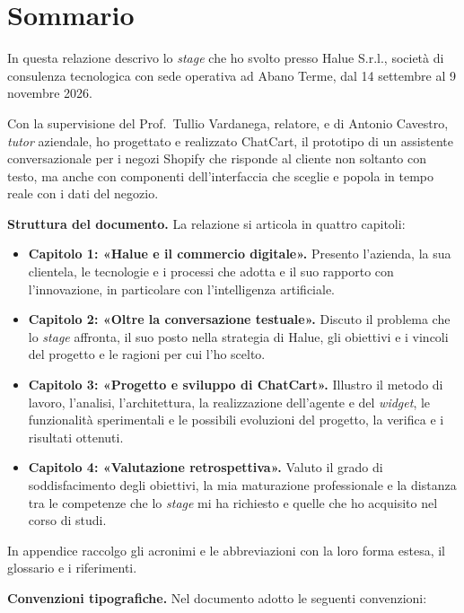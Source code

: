
\chapter*{Sommario}

In questa relazione descrivo lo \emph{stage} che ho svolto presso Halue S.r.l., società di
consulenza tecnologica con sede operativa ad Abano Terme, dal 14 settembre al 9 novembre 2026.

Con la supervisione del Prof. Tullio Vardanega, relatore, e di Antonio Cavestro, \emph{tutor}
aziendale, ho progettato e realizzato ChatCart, il prototipo di un assistente conversazionale per i
negozi Shopify che risponde al cliente non soltanto con testo, ma anche con componenti
dell’interfaccia che sceglie e popola in tempo reale con i dati del negozio.

\textbf{Struttura del documento.} La relazione si articola in quattro capitoli:

\begin{itemize}
        \item \textbf{Capitolo 1: «Halue e il commercio digitale».} Presento l’azienda, la sua
	clientela, le tecnologie e i processi che adotta e il suo rapporto con l’innovazione, in
	particolare con l’intelligenza artificiale.
        \item \textbf{Capitolo 2: «Oltre la conversazione testuale».} Discuto il problema che lo
	\emph{stage} affronta, il suo posto nella strategia di Halue, gli obiettivi e i vincoli del
	progetto e le ragioni per cui l’ho scelto.
        \item \textbf{Capitolo 3: «Progetto e sviluppo di ChatCart».} Illustro il metodo di lavoro,
	l’analisi, l’architettura, la realizzazione dell’agente e del \emph{widget}, le funzionalità
	sperimentali e le possibili evoluzioni del progetto, la verifica e i risultati ottenuti.
        \item \textbf{Capitolo 4: «Valutazione retrospettiva».} Valuto il grado di soddisfacimento
	degli obiettivi, la mia maturazione professionale e la distanza tra le competenze che lo
	\emph{stage} mi ha richiesto e quelle che ho acquisito nel corso di studi.
\end{itemize}

In appendice raccolgo gli acronimi e le abbreviazioni con la loro forma estesa, il glossario e i riferimenti.

\newpage

\textbf{Convenzioni tipografiche.} Nel documento adotto le seguenti convenzioni:

